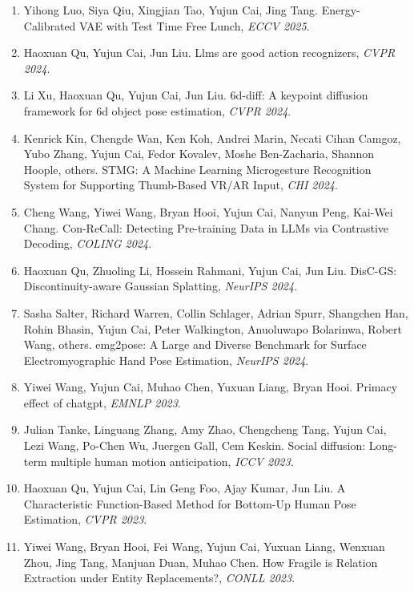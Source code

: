 \begin{enumerate}
\item Yihong Luo, Siya Qiu, Xingjian Tao, Yujun Cai, Jing Tang. Energy-Calibrated VAE with Test Time Free Lunch, \textit{ECCV 2025}.

\item Haoxuan Qu, Yujun Cai, Jun Liu. Llms are good action recognizers, \textit{CVPR 2024}.

\item Li Xu, Haoxuan Qu, Yujun Cai, Jun Liu. 6d-diff: A keypoint diffusion framework for 6d object pose estimation, \textit{CVPR 2024}.

\item Kenrick Kin, Chengde Wan, Ken Koh, Andrei Marin, Necati Cihan Camgoz, Yubo Zhang, Yujun Cai, Fedor Kovalev, Moshe Ben-Zacharia, Shannon Hoople, others. STMG: A Machine Learning Microgesture Recognition System for Supporting Thumb-Based VR/AR Input, \textit{CHI 2024}.

\item Cheng Wang, Yiwei Wang, Bryan Hooi, Yujun Cai, Nanyun Peng, Kai-Wei Chang. Con-ReCall: Detecting Pre-training Data in LLMs via Contrastive Decoding, \textit{COLING 2024}.

\item Haoxuan Qu, Zhuoling Li, Hossein Rahmani, Yujun Cai, Jun Liu. DisC-GS: Discontinuity-aware Gaussian Splatting, \textit{NeurIPS 2024}.

\item Sasha Salter, Richard Warren, Collin Schlager, Adrian Spurr, Shangchen Han, Rohin Bhasin, Yujun Cai, Peter Walkington, Anuoluwapo Bolarinwa, Robert Wang, others. emg2pose: A Large and Diverse Benchmark for Surface Electromyographic Hand Pose Estimation, \textit{NeurIPS 2024}.

\item Yiwei Wang, Yujun Cai, Muhao Chen, Yuxuan Liang, Bryan Hooi. Primacy effect of chatgpt, \textit{EMNLP 2023}.

\item Julian Tanke, Linguang Zhang, Amy Zhao, Chengcheng Tang, Yujun Cai, Lezi Wang, Po-Chen Wu, Juergen Gall, Cem Keskin. Social diffusion: Long-term multiple human motion anticipation, \textit{ICCV 2023}.

\item Haoxuan Qu, Yujun Cai, Lin Geng Foo, Ajay Kumar, Jun Liu. A Characteristic Function-Based Method for Bottom-Up Human Pose Estimation, \textit{CVPR 2023}.

\item Yiwei Wang, Bryan Hooi, Fei Wang, Yujun Cai, Yuxuan Liang, Wenxuan Zhou, Jing Tang, Manjuan Duan, Muhao Chen. How Fragile is Relation Extraction under Entity Replacements?, \textit{CONLL 2023}.


\end{enumerate}
